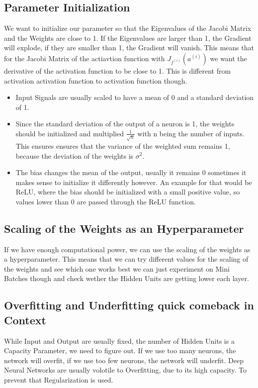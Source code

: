 \documentclass[a4paper]{article}
\begin{document}
\subsection{Parameter Initialization}
We want to initialize our parameter so that the Eigenvalues of the Jacobi Matrix and the Weights are close to 1. If the Eigenvalues are larger than 1, the Gradient will explode, if they are smaller than 1, the Gradient will vanish. This means that for the Jacobi Matrix of the actiavtion function with $J_{f^{(i)}}(a^{(i)})$ we want 
the derivative of the activation function to be close to 1. This is different from activation activation function to activation function though.  \\ 
\begin{itemize}
    \item Input Signals are usually scaled to have a mean of 0 and a standard deviation of 1. 
    \item Since the standard deviation of the output of a neuron is  1, the weights should be initialized and multiplied $\frac{1}{\sqrt{n}}$ with n being the number of inputs. This ensures ensures that the variance of the weighted sum remains 1, because the deviation of the weights is $\sigma^{2}$.
    \item The bias changes the mean of the output, usually it remains $0$ sometimes it makes sense to initialize it differently however. An example for that would be ReLU, where the bias should be initialized with a small positive value, so values lower than 0 are passed through the ReLU function.
\end{itemize}
\subsection{Scaling of the Weights as an Hyperparameter}
If we have enough computational power, we can use the scaling of the weights as a hyperparameter. This means that we can try different values for the scaling of the weights and see which one works best we can just experiment on Mini Batches though and check wether the Hidden Units are getting lower each layer. 

\subsection{Overfitting and Underfitting quick comeback in Context}
While Input and Output are usually fixed, the number of Hidden Units is a Capacity Parameter, we need to figure out. If we use too many neurons, the network will overfit, if we use too few neurons, the network will underfit. Deep Neural Networks are usually volotile to Overfitting, due to its high capacity. To prevent that Regularization 
is used.
\end{document}
